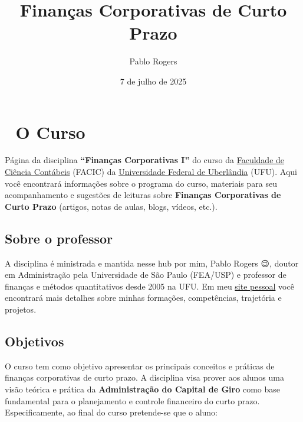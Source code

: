 \documentclass[
  a4paper,
]{book}
\title{Finanças Corporativas de Curto Prazo}
\author{Pablo Rogers}
\date{7 de julho de 2025}
\renewcommand*\contentsname{Índice}
\newcommand\contentsname{Índice}
\begin{document}
\frontmatter
\maketitle

\renewcommand*\contentsname{Índice}
{
\hypersetup{linkcolor=}
\setcounter{tocdepth}{2}
\tableofcontents
}
\mainmatter
{}

\chapter*{🏢 O Curso}\label{sec-home}


Página da disciplina \textbf{``Finanças Corporativas I''} do curso da
\href{https://www.facic.ufu.br/}{Faculdade de Ciência Contábeis} (FACIC)
da \href{https://ufu.br/}{Universidade Federal de Uberlândia} (UFU).
Aqui você encontrará informações sobre o programa do curso, materiais
para seu acompanhamento e sugestões de leituras sobre \textbf{Finanças
Corporativas de Curto Prazo} (artigos, notas de aulas, blogs, vídeos,
etc.).

\section*{Sobre o professor}\label{sec-instrutor}


A disciplina é ministrada e mantida nesse hub por mim, Pablo Rogers 😉,
doutor em Administração pela Universidade de São Paulo (FEA/USP) e
professor de finanças e métodos quantitativos desde 2005 na UFU. Em meu
\href{https://phdpablo.com/}{site pessoal} você encontrará mais detalhes
sobre minhas formações, competências, trajetória e projetos.

\section*{Objetivos}\label{sec-about}


O curso tem como objetivo apresentar os principais conceitos e práticas
de finanças corporativas de curto prazo. A disciplina visa prover aos
alunos uma visão teórica e prática da \textbf{Administração do Capital
de Giro} como base fundamental para o planejamento e controle financeiro
do curto prazo. Especificamente, ao final do curso pretende-se que o
aluno:
\end{document}
